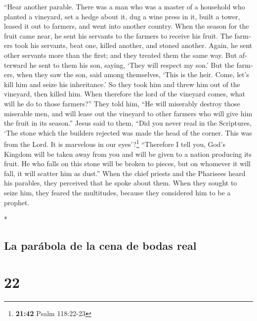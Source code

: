 \begin{paracol}{2}
\begin{otherlanguage}{english}
 ``Hear another parable. There was a man who was a master
of a household who planted a vineyard, set a hedge about it, dug a wine
press in it, built a tower, leased it out to farmers, and went into
another country.  When the season for the fruit came
near, he sent his servants to the farmers to receive his fruit.
 The farmers took his servants, beat one, killed another,
and stoned another.  Again, he sent other servants more
than the first; and they treated them the same way.  But
afterward he sent to them his son, saying, `They will respect my son.'
 But the farmers, when they saw the son, said among
themselves, `This is the heir. Come, let's kill him and seize his
inheritance.'  So they took him and threw him out of the
vineyard, then killed him.  When therefore the lord of
the vineyard comes, what will he do to those farmers?'' 
They told him, ``He will miserably destroy those miserable men, and will
lease out the vineyard to other farmers who will give him the fruit in
its season.''  Jesus said to them, ``Did you never read
in the Scriptures, `The stone which the builders rejected was made the
head of the corner. This was from the Lord. It is marvelous in our
eyes'?\footnote{\textbf{21:42} Psalm 118:22-23} 
``Therefore I tell you, God's Kingdom will be taken away from you and
will be given to a nation producing its fruit.  He who
falls on this stone will be broken to pieces, but on whomever it will
fall, it will scatter him as dust.''  When the chief
priests and the Pharisees heard his parables, they perceived that he
spoke about them.  When they sought to seize him, they
feared the multitudes, because they considered him to be a prophet.

\end{otherlanguage}

\switchcolumn[0]*

\hypertarget{la-paruxe1bola-de-la-cena-de-bodas-real}{%
\subsection{La parábola de la cena de bodas
real}\label{la-paruxe1bola-de-la-cena-de-bodas-real}}

\hypertarget{section-42}{%
\section{22}\label{section-42}}


\end{paracol}
